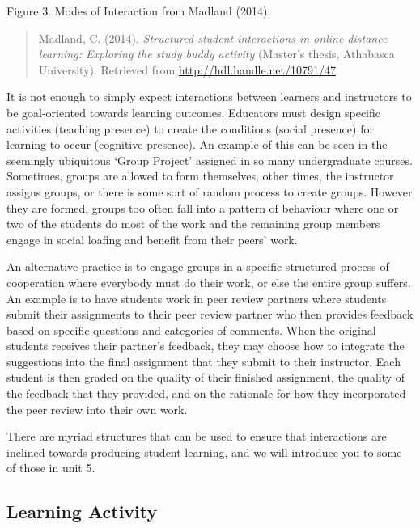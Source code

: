 \documentclass[
]{book}
\begin{document}
Figure 3. Modes of Interaction from Madland (2014).

\begin{quote}
Madland, C. (2014). \emph{Structured student interactions in online distance learning: Exploring the study buddy activity} (Master's thesis, Athabasca University). Retrieved from \url{http://hdl.handle.net/10791/47}
\end{quote}

It is not enough to simply expect interactions between learners and instructors to be goal-oriented towards learning outcomes. Educators must design specific activities (teaching presence) to create the conditions (social presence) for learning to occur (cognitive presence). An example of this can be seen in the seemingly ubiquitous `Group Project' assigned in so many undergraduate courses. Sometimes, groups are allowed to form themselves, other times, the instructor assigns groups, or there is some sort of random process to create groups. However they are formed, groups too often fall into a pattern of behaviour where one or two of the students do most of the work and the remaining group members engage in social loafing and benefit from their peers' work.

An alternative practice is to engage groups in a specific structured process of cooperation where everybody must do their work, or else the entire group suffers. An example is to have students work in peer review partners where students submit their assignments to their peer review partner who then provides feedback based on specific questions and categories of comments. When the original students receives their partner's feedback, they may choose how to integrate the suggestions into the final assignment that they submit to their instructor. Each student is then graded on the quality of their finished assignment, the quality of the feedback that they provided, and on the rationale for how they incorporated the peer review into their own work.

There are myriad structures that can be used to ensure that interactions are inclined towards producing student learning, and we will introduce you to some of those in unit 5.

\hypertarget{learning-activity-1}{%
\subsection*{Learning Activity}\label{learning-activity-1}}
\end{document}
